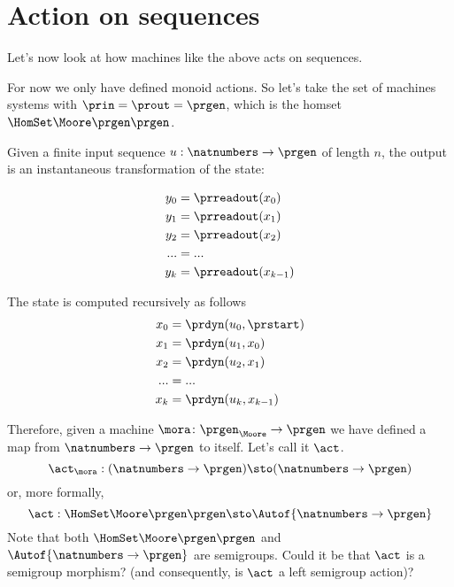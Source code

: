 \section{Action on sequences}

Let's now look at how machines like the above acts on sequences. 

For now we only have defined monoid actions. So let's take the set of machines systems with $\prin = \prout = \prgen$, which is the homset $\HomSet\Moore\prgen\prgen$.

Given a finite input sequence $u: \natnumbers \to \prgen$ of length $n$, the output is an instantaneous transformation of the state:

\begin{equation}
  \begin{aligned}
  y_0 &= \prreadout(x_0) \\ 
  y_1 &= \prreadout(x_1) \\ 
  y_2 &= \prreadout(x_2) \\ 
  ... &= ...  \\
  y_{k} &= \prreadout(x_{k-1}) 
\end{aligned} 
\end{equation}

The state is computed recursively as follows 
\begin{equation}
  \begin{aligned}
  x_0 &= \prdyn(u_0, \prstart) \\ 
  x_1 &= \prdyn(u_1, x_0) \\ 
  x_2 &= \prdyn(u_2, x_1) \\ 
  ... &= ... \\
  x_{k} &= \prdyn(u_{k}, x_{k-1}) 
  \end{aligned}
\end{equation}

Therefore, given a machine $\mora \colon \prgen_{\Moore} \to \prgen$ we have defined a map from $\natnumbers \to \prgen$ to itself. Let's call it $\act$.
% 
\begin{equation}
\act_{\mora}:  (\natnumbers \to \prgen)  \sto  (\natnumbers \to \prgen)
\end{equation}
% 
or, more formally,
% 
  \begin{equation}
    \act: \HomSet\Moore\prgen\prgen \sto \Autof {\natnumbers \to \prgen}
\end{equation}
%
Note that both $\HomSet\Moore\prgen\prgen$ and $\Autof {\natnumbers \to \prgen}$ are semigroups. Could it be that $\act$ is a semigroup morphism? (and consequently, is $\act$ a left semigroup action)?

